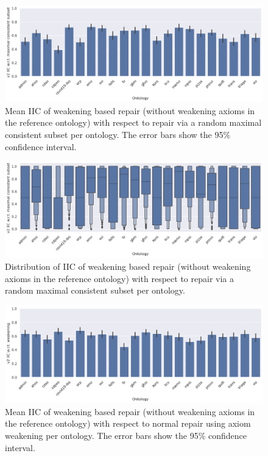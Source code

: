\begin{figure}[ht]
  \centering
  \includegraphics[width=\textwidth]{resources/iic-enhance-ontology-bar.png}
  \caption{Mean IIC of weakening based repair (without weakening axioms in the reference ontology) with respect to repair via a random maximal consistent subset per ontology. The error bars show the 95\% confidence interval.}
\end{figure}

\begin{figure}[ht]
    \centering
    \includegraphics[width=\textwidth]{resources/iic-enhance-ontology-violin.png}
    \caption{Distribution of IIC of weakening based repair (without weakening axioms in the reference ontology) with respect to repair via a random maximal consistent subset per ontology.}
\end{figure}

\begin{figure}[ht]
  \centering
  \includegraphics[width=\textwidth]{resources/iic-enhance-weaken-ontology-bar.png}
  \caption{Mean IIC of weakening based repair (without weakening axioms in the reference ontology) with respect to normal repair using axiom weakening per ontology. The error bars show the 95\% confidence interval.}
\end{figure}

